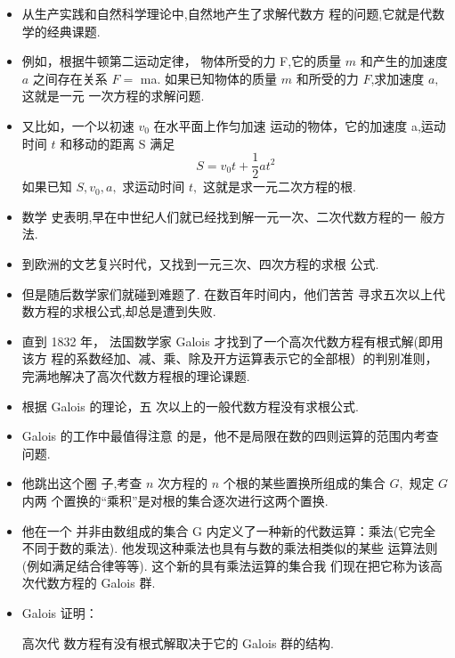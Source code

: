 \documentclass[13pt]{beamer}
\begin{document}
\begin{frame}
\begin{itemize}
\item 从生产实践和自然科学理论中,自然地产生了\alert{求解代数方
程}的问题,它就是代数学的经典课题.
\item 
例如，根据牛顿第二运动定律， 物体所受的力 F,它的质量 $m$ 和产生的加速度 $a$ 之间存在关系 $F=$ ma. 
如果已知物体的质量 $m$ 和所受的力 $F$,求加速度 $a,$ 这就是\alert{一元 一次方程}的求解问题.
\item  又比如，一个以初速 $v_{0}$ 在水平面上作匀加速 运动的物体，它的加速度 a,运动时间 $t$ 和移动的距离 S 满足
\[
S=v_{0} t+\frac{1}{2} a t^{2}
\]
如果已知 $S, v_{0}, a,$ 求运动时间 $t,$ 这就是求\alert{一元二次方程}的根.
\end{itemize}


 

\end{frame} 


\begin{frame}
\begin{itemize}
\item 数学 史表明,早在中世纪人们就已经找到解一元一次、二次代数方程的一 般方法. 
\item 到欧洲的文艺复兴时代，又找到\alert{一元三次、四次方程}的求根 公式. 
\item 但是随后数学家们就碰到难题了. 在数百年时间内，他们苦苦 寻求五次以上代数方程的求根公式,却总是遭到失败. 
\pause
\item 直到 1832 年， 法国数学家 Galois 才找到了一个\alert{高次代数方程}有根式解(即用该方 程的系数经加、减、乘、除及开方运算表示它的全部根）的判别准则， 完满地解决了高次代数方程根的理论课题. 
\end{itemize}
\end{frame}


\begin{frame}
\begin{itemize}
	\item
	根据 Galois 的理论，五 次以上的一般代数方程没有求根公式. 

	\item Galois 的工作中最值得注意 的是，他不是局限在数的四则运算的范围内考查问题. 

	\item 他跳出这个圈 子,考查 $n$ 次方程的 $n$ 个根的某些\alert{置换}所组成的集合 $G,$ 规定 $G$ 内两 个置换的“乘积”是对根的集合逐次进行这两个置换. 

	\item 他在一个 并非由数组成的集合 G 内定义了一种新的代数运算：\alert{乘法}(它完全 不同于数的乘法). 他发现这种乘法也具有与数的乘法相类似的某些 运算法则(例如满足结合律等等). 这个新的具有乘法运算的集合我 们现在把它称为该高次代数方程的 \alert{Galois 群}. 

	\item Galois 证明：
\begin{center}
高次代 数方程有没有根式解取决于它的 Galois 群的结构. 
\end{center}
\end{itemize}
\end{frame}
\end{document}
